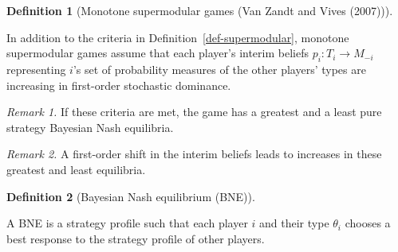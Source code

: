 \documentclass[
]{article}
\theoremstyle{plain}
\theoremstyle{definition}
\newtheorem{definition}{Definition}[section]
\theoremstyle{remark}
\begin{document}
\begin{definition}[Monotone supermodular games (Van Zandt and Vives
(2007))]\protect\hypertarget{def-monsupermodular}{}\label{def-monsupermodular}

In addition to the criteria in Definition~\ref{def-supermodular},
monotone supermodular games assume that each player's interim beliefs
\(p_i : T_i \to M_{-i}\) representing \(i\)'s set of probability
measures of the other players' types are increasing in first-order
stochastic dominance.

\emph{Remark 1.} If these criteria are met, the game has a greatest and
a least pure strategy Bayesian Nash equilibria.

\emph{Remark 2.} A first-order shift in the interim beliefs leads to
increases in these greatest and least equilibria.

\end{definition}

\begin{definition}[Bayesian Nash equilibrium
(BNE)]\protect\hypertarget{def-BNE}{}\label{def-BNE}

A BNE is a strategy profile such that each player \(i\) and their type
\(\theta_i\) chooses a best response to the strategy profile of other
players.

\end{definition}
\end{document}
